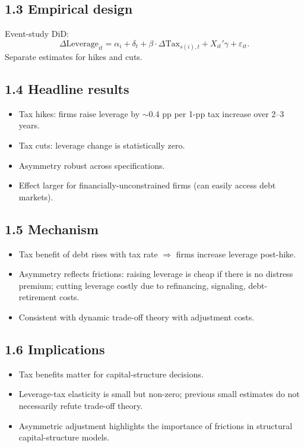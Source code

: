 \documentclass[11pt]{article}
\begin{document}
\subsection*{1.3 Empirical design}
Event-study DiD:
\[
\Delta\text{Leverage}_{it}=\alpha_i+\delta_t+\beta\cdot\Delta\text{Tax}_{s(i),t}+X_{it}'\gamma+\varepsilon_{it}.
\]
Separate estimates for hikes and cuts.

\subsection*{1.4 Headline results}
\begin{itemize}
\item Tax hikes: firms raise leverage by $\sim$0.4 pp per 1-pp tax increase over 2--3 years.
\item Tax cuts: leverage change is statistically zero.
\item Asymmetry robust across specifications.
\item Effect larger for financially-unconstrained firms (can easily access debt markets).
\end{itemize}

\subsection*{1.5 Mechanism}
\begin{itemize}
\item Tax benefit of debt rises with tax rate $\Rightarrow$ firms increase leverage post-hike.
\item Asymmetry reflects frictions: raising leverage is cheap if there is no distress premium; cutting leverage costly due to refinancing, signaling, debt-retirement costs.
\item Consistent with dynamic trade-off theory with adjustment costs.
\end{itemize}

\subsection*{1.6 Implications}
\begin{itemize}
\item Tax benefits matter for capital-structure decisions.
\item Leverage-tax elasticity is small but non-zero; previous small estimates do not necessarily refute trade-off theory.
\item Asymmetric adjustment highlights the importance of frictions in structural capital-structure models.
\end{itemize}
\end{document}
